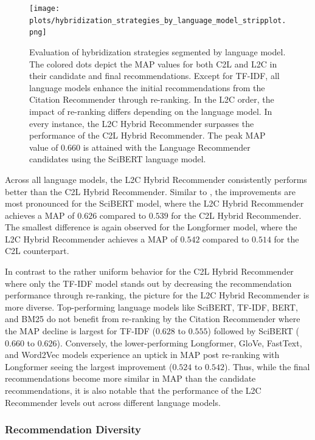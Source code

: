 \begin{figure}[htb!]
    \centering
    \texttt{[image: plots/hybridization\_strategies\_by\_language\_model\_stripplot.png]}
    \caption[Evaluation of Hybridization Strategies by Language Model]{Evaluation of hybridization strategies segmented by language model. The colored dots depict the \ac{MAP} values for both \ac{C2L} and \ac{L2C} in their candidate and final recommendations. Except for TF-IDF, all language models enhance the initial recommendations from the Citation Recommender through re-ranking. In the \ac{L2C} order, the impact of re-ranking differs depending on the language model. In every instance, the \ac{L2C} Hybrid Recommender surpasses the performance of the \ac{C2L} Hybrid Recommender. The peak \ac{MAP} value of $0.660$ is attained with the Language Recommender candidates using the SciBERT language model.}
    \label{fig:hybridization-strategies-by-language-model}
\end{figure}

Across all language models, the \ac{L2C} Hybrid Recommender consistently performs better than the \ac{C2L} Hybrid Recommender. Similar to , the improvements are most pronounced for the SciBERT model, where the \ac{L2C} Hybrid Recommender achieves a \ac{MAP} of $0.626$ compared to $0.539$ for the \ac{C2L} Hybrid Recommender. The smallest difference is again observed for the Longformer model, where the \ac{L2C} Hybrid Recommender achieves a \ac{MAP} of $0.542$ compared to $0.514$ for the \ac{C2L} counterpart.

In contrast to the rather uniform behavior for the \ac{C2L} Hybrid Recommender where only the TF-IDF model stands out by decreasing the recommendation performance through re-ranking, the picture for the \ac{L2C} Hybrid Recommender is more diverse.
Top-performing language models like SciBERT, TF-IDF, BERT, and BM25 do not benefit from re-ranking by the Citation Recommender where the \ac{MAP} decline is largest for TF-IDF ($0.628$ to $0.555$) followed by SciBERT ($0.660$ to $0.626$).
Conversely, the lower-performing Longformer, GloVe, FastText, and Word2Vec models experience an uptick in \ac{MAP} post re-ranking with Longformer seeing the largest improvement ($0.524$ to $0.542$).
Thus, while the final recommendations become more similar in \ac{MAP} than the candidate recommendations, it is also notable that the performance of the \ac{L2C} Recommender levels out across different language models.


\subsubsection*{Recommendation Diversity}

